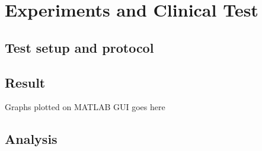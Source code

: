 \chapter{Experiments and Clinical Test}
\section{Test setup and protocol}


\section{Result}
Graphs plotted on MATLAB GUI goes here

\section{Analysis}